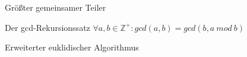 \documentclass[a4paper]{article}
\begin{document}
\begin{multicols}{3}
      Größter gemeinsamer Teiler
      \begin{itemize*}
            \item Der gcd-Rekursionssatz $\forall a, b \in \mathbb{Z}^+: gcd(a, b) = gcd(b, a\ mod\ b)$
            \item Erweiterter euklidischer Algorithmus%

\end{itemize*}
\end{multicols}
\end{document}

